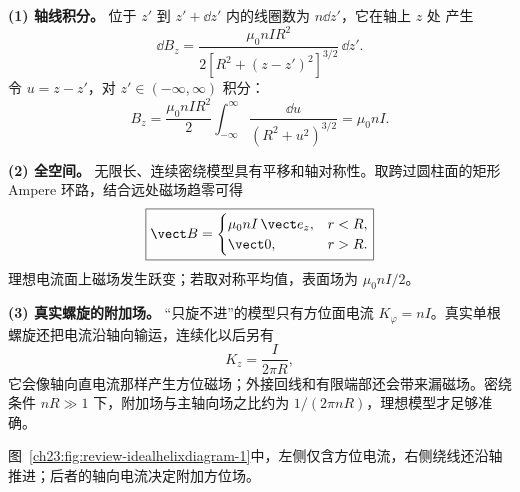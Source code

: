 \begin{xesolution}
\textbf{(1) 轴线积分。} 位于 $z'$ 到 $z'+\dd z'$ 内的线圈数为 $n\dd z'$，它在轴上 $z$ 处
产生
\[
  \dd B_z=\frac{\mu_0nIR^2}{2[R^2+(z-z')^2]^{3/2}}\,\dd z'.
\]
令 $u=z-z'$，对 $z'\in(-\infty,\infty)$ 积分：
\[
  B_z=\frac{\mu_0nIR^2}{2}
  \int_{-\infty}^{\infty}\frac{\dd u}{(R^2+u^2)^{3/2}}
  =\boxed{\mu_0nI}.
\]

\textbf{(2) 全空间。} 无限长、连续密绕模型具有平移和轴对称性。取跨过圆柱面的矩形 Ampere
环路，结合远处磁场趋零可得
\begin{equation}
  \boxed{\vect B=
  \begin{cases}
    \mu_0nI\,\vect e_z,&r<R,\\
    \vect0,&r>R.
  \end{cases}}
\end{equation}
理想电流面上磁场发生跃变；若取对称平均值，表面场为 $\mu_0nI/2$。

\textbf{(3) 真实螺旋的附加场。} “只旋不进”的模型只有方位面电流
$K_\varphi=nI$。真实单根螺旋还把电流沿轴向输运，连续化以后另有
\[
  K_z=\frac{I}{2\pi R},
\]
它会像轴向直电流那样产生方位磁场；外接回线和有限端部还会带来漏磁场。密绕条件
$nR\gg1$ 下，附加场与主轴向场之比约为 $1/(2\pi nR)$，理想模型才足够准确。

图~\ref{ch23:fig:review-idealhelixdiagram-1}中，左侧仅含方位电流，右侧绕线还沿轴推进；后者的轴向电流决定附加方位场。
\par\noindent\begin{minipage}{\linewidth}
\idealHelixDiagram
{}\label{ch23:fig:review-idealhelixdiagram-1}
\end{minipage}\par\medskip
\end{xesolution}


